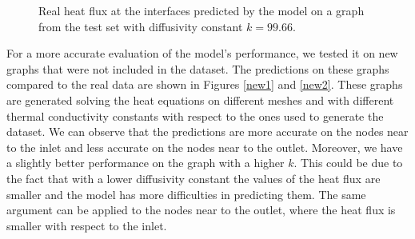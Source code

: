 \documentclass[11pt,a4paper]{article}
\begin{document}
\begin{figure}[H]
    \centering
    \caption{Real heat flux at the interfaces predicted by the model on a graph from the test set with diffusivity constant \(k=99.66\).}
    \label{test}
\end{figure}

For a more accurate evaluation of the model's performance, we tested it on new graphs that were not included in the dataset. 
The predictions on these graphs compared to the real data are shown in Figures \ref{new1} and \ref{new2}. 
These graphs are generated solving the heat equations on different meshes and with different thermal conductivity constants with respect to the ones used to generate the dataset. 
We can observe that the predictions are more accurate on the nodes near to the inlet and less accurate on the nodes near to the outlet. 
Moreover, we have a slightly better performance on the graph with a higher \(k\). 
This could be due to the fact that with a lower diffusivity constant the values of the heat flux are smaller and the model has more difficulties in predicting them. The same argument can be applied to the nodes near to the outlet, where the heat flux is smaller with respect to the inlet.
\end{document}
